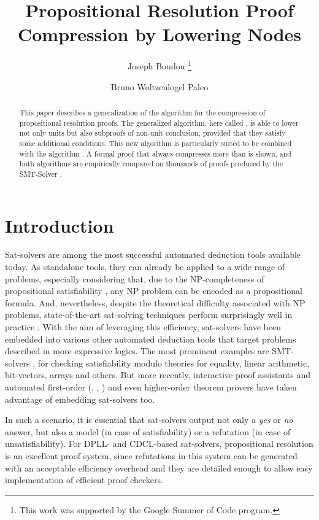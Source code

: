 \documentclass{llncs}
\title{Propositional Resolution Proof Compression by Lowering Nodes}
\author{
  Joseph Boudou\inst{1}
  \thanks{This work was supported by the Google Summer of Code program.}
  \and 
  Bruno Woltzenlogel Paleo\inst{2}
}
\institute{
  Universit\'e Paul Sabatier, Toulouse \\
  \email{joseph.boudou@matabio.net}
  \and 
  Vienna University of Technology \\
  \email{bruno@logic.at}
}
\begin{document}
\maketitle


\begin{abstract}
This paper describes a generalization of the {\LowerUnits} algorithm \cite{LURPI} for the
compression of propositional resolution proofs.  The generalized algorithm, here called
{\LowerUnivalents}, is able to lower not only units but also subproofs of non-unit
conclusion, provided that they satisfy some additional conditions. 
This new algorithm is particularly suited to be combined with the {\RPI} algorithm \cite{LURPI}.
A formal proof that
{\LowerUnivalents} always compresses more than {\LowerUnits} is shown, and both algorithms are
empirically compared on thousands of proofs produced by the SMT-Solver \veriT.
\end{abstract}

\setcounter{footnote}{0}

\section{Introduction}

Sat-solvers are among the most successful automated deduction tools available today. As standalone
tools, they can already be applied to a wide range of problems, especially considering that, due to
the NP-completeness of propositional satisfiability \cite{cook}, any NP problem can be encoded as a
propositional formula. And, nevertheless, despite the theoretical difficulty associated with NP
problems, state-of-the-art sat-solving techniques perform surprisingly well in practice
\cite{sat-competition}. With the aim of leveraging this efficiency, sat-solvers have been embedded
into various other automated deduction tools that target problems described in more expressive
logics. The most prominent examples are SMT-solvers \cite{veriT}, for checking satisfiability modulo
theories for equality, linear arithmetic, bit-vectors, arrays and others. But more recently,
interactive proof assistants \cite{isabelle-blanchette-boehme} and automated first-order
(\cite{spassT}, \cite{iProver}, \cite{Vampire}) and even higher-order \cite{satallax} theorem provers have
taken advantage of embedding sat-solvers too.

In such a scenario, it is essential that sat-solvers output not only a \emph{yes} or \emph{no}
answer, but also a model (in case of satisfiability) or a refutation (in case of unsatisfiability).
For DPLL- and CDCL-based sat-solvers, propositional resolution is an excellent proof system, since
refutations in this system can be generated with an acceptable efficiency overhead and they are
detailed enough to allow easy implementation of efficient proof checkers.
\end{document}
